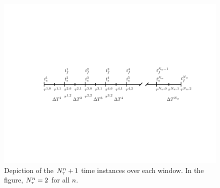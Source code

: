 \begin{figure} 
\begin{centering} 
\includegraphics[trim={0.0cm 4.5cm 0cm 3cm},clip,width=1.0\textwidth]{figs/time_grid_timesteps.pdf} 
	\caption{Depiction of the $N_{\tau}^{n}+1$ time instances over each window. In the figure, $N_{\tau}^{n} = 2$ for all $n$.} 
\label{fig:slab_fig2} 
\end{centering} 
\end{figure}

